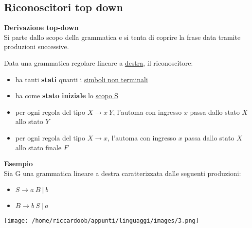 \subsection{Riconoscitori top down}
\textbf{Derivazione top-down}\\
Si parte dallo scopo della grammatica e si tenta di coprire la frase data tramite produzioni successive.\\
\begin{multicols}{2}
Data una grammatica regolare lineare a \underline{destra}, il riconoscitore:

\begin{itemize}
    \item ha tanti \textbf{stati} quanti i \underline{simboli non terminali}
    \item ha come \textbf{stato iniziale} lo \underline{scopo S}
    \item per ogni regola del tipo $X \rightarrow x\ Y$, l'automa con ingresso $x$ passa dallo stato $X$ allo stato $Y$
    \item per ogni regola del tipo $X \rightarrow x$, l'automa con ingresso $x$ passa dallo stato $X$ allo stato finale $F$
\end{itemize}
\columnbreak
\textbf{Esempio}\\
Sia G una grammatica lineare a destra caratterizzata dalle seguenti produzioni:
\begin{itemize}
    \item $S \rightarrow a\ B\ |\ b$
    \item $B \rightarrow b\ S\ |\ a$
\end{itemize}
\begin{multicolfigure}
    \centering
    \texttt{[image: /home/riccardoob/appunti/linguaggi/images/3.png]}
\end{multicolfigure}
\end{multicols}

